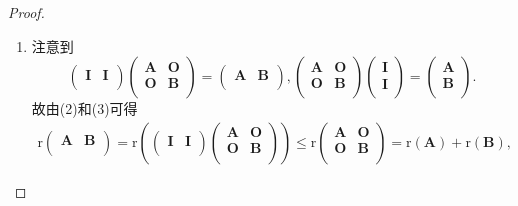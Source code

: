 \documentclass[lang=cn,newtx,10pt,scheme=chinese]{elegantbook}
\begin{document}
\begin{proof}
\begin{enumerate}[(1)]
\item  注意到
\[
\left( \begin{matrix}
\boldsymbol{I}&		\boldsymbol{I}\\
\end{matrix} \right) \left( \begin{matrix}
\boldsymbol{A}&		\boldsymbol{O}\\
\boldsymbol{O}&		\boldsymbol{B}\\
\end{matrix} \right) =\left( \begin{matrix}
\boldsymbol{A}&		\boldsymbol{B}\\
\end{matrix} \right) ,\left( \begin{matrix}
\boldsymbol{A}&		\boldsymbol{O}\\
\boldsymbol{O}&		\boldsymbol{B}\\
\end{matrix} \right) \left( \begin{array}{c}
\boldsymbol{I}\\
\boldsymbol{I}\\
\end{array} \right) =\left( \begin{array}{c}
\boldsymbol{A}\\
\boldsymbol{B}\\
\end{array} \right) .
\]
故由(2)和(3)可得
\begin{align*}
\mathrm{r}\left( \begin{matrix}
\boldsymbol{A}&		\boldsymbol{B}\\
\end{matrix} \right) =\mathrm{r}\left( \left( \begin{matrix}
\boldsymbol{I}&		\boldsymbol{I}\\
\end{matrix} \right) \left( \begin{matrix}
\boldsymbol{A}&		\boldsymbol{O}\\
\boldsymbol{O}&		\boldsymbol{B}\\
\end{matrix} \right) \right) \leqslant \mathrm{r}\left( \begin{matrix}
\boldsymbol{A}&		\boldsymbol{O}\\
\boldsymbol{O}&		\boldsymbol{B}\\
\end{matrix} \right) =\mathrm{r}\left( \boldsymbol{A} \right) +\mathrm{r}\left( \boldsymbol{B} \right) ,

\end{align*}
\end{enumerate}
\end{proof}
\end{document}
